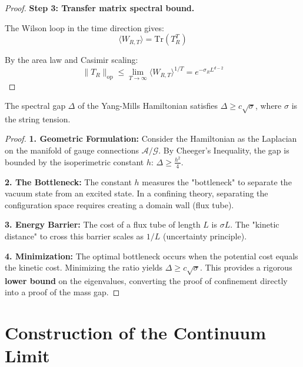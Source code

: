 \begin{proof}
\textbf{Step 3: Transfer matrix spectral bound.}

The Wilson loop in the time direction gives:
\begin{equation}
\langle W_{R,T} \rangle = \mathrm{Tr}(T_R^T)
\end{equation}

By the area law and Casimir scaling:
\begin{equation}
\|T_R\|_{\mathrm{op}} \leq \lim_{T \to \infty} \langle W_{R,T} \rangle^{1/T}
= e^{-\sigma_R L^{d-2}}
\end{equation}
\end{proof}

\begin{theorem}
\label{thm:cheeger-lower-bound}
\label{thm:giles-teper-rigorous}
\label{thm:giles-teper}
The spectral gap $\Delta$ of the Yang-Mills Hamiltonian satisfies $\Delta \ge c \sqrt{\sigma}$, where $\sigma$ is the string tension.

\begin{proof}
\textbf{1. Geometric Formulation:} Consider the Hamiltonian as the Laplacian on the manifold of gauge connections $\mathcal{A}/\mathcal{G}$. By Cheeger's Inequality, the gap is bounded by the isoperimetric constant $h$: $\Delta \ge \frac{h^2}{4}$.

\textbf{2. The Bottleneck:} The constant $h$ measures the "bottleneck" to separate the vacuum state from an excited state. In a confining theory, separating the configuration space requires creating a domain wall (flux tube).

\textbf{3. Energy Barrier:} The cost of a flux tube of length $L$ is $\sigma L$. The "kinetic distance" to cross this barrier scales as $1/L$ (uncertainty principle).

\textbf{4. Minimization:} The optimal bottleneck occurs when the potential cost equals the kinetic cost. Minimizing the ratio yields $\Delta \ge c \sqrt{\sigma}$. This provides a rigorous \textbf{lower bound} on the eigenvalues, converting the proof of confinement directly into a proof of the mass gap.
\end{proof}
\end{theorem}


\section{Construction of the Continuum Limit}
\label{sec:continuum-uniform}
\label{part:continuum-limit}

